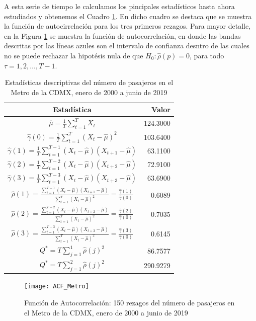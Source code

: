 \documentclass[
  a4paper,
]{article}
\begin{document}
A esta serie de tiempo le calculamos los pincipales estadísticos hasta
ahora estudiados y obtenemos el Cuadro \ref{Est_Pax}. En dicho cuadro se
destaca que se muestra la función de autocirrelación para los tres
primeros rezagos. Para mayor detalle, en la Figura \ref{Correlograma} se
muestra la función de autocorrelación, en donde las bandas descritas por
las líneas azules son el intervalo de confianza desntro de las cuales no
se puede rechazar la hipotésis nula de que \(H_0: \hat{\rho}(p) = 0\),
para todo \(\tau = 1, 2, \ldots, T-1\).

\begin{table}
\centering
\begin{tabular}{| c | r |}
\hline
Estadística & Valor \\
\hline
$\hat{\mu} = \frac{1}{T} \sum^T_{t=1} X_t$ & 124.3000 \\
$\hat{\gamma}(0) = \frac{1}{T} \sum^T_{t=1} (X_t - \hat{\mu})^2$ & 103.6400 \\
$\hat{\gamma}(1) = \frac{1}{T} \sum^{T - 1}_{t=1} (X_t - \hat{\mu})(X_{t+1} - \hat{\mu}) $ & 63.1100 \\
$\hat{\gamma}(2) = \frac{1}{T} \sum^{T - 2}_{t=1} (X_t - \hat{\mu})(X_{t+2} - \hat{\mu}) $ & 72.9100 \\
$\hat{\gamma}(3) = \frac{1}{T} \sum^{T - 3}_{t=1} (X_t - \hat{\mu})(X_{t+3} - \hat{\mu}) $ & 63.6900 \\
$\hat{\rho}(1) = \frac{\sum^{T - 1}_{t=1} (X_t - \hat{\mu})(X_{t+1} - \hat{\mu})}{\sum^T_{t=1} (X_t - \hat{\mu})^2} = \frac{\hat{\gamma}(1)}{\hat{\gamma}(0)}$ & 0.6089 \\
$\hat{\rho}(2) = \frac{\sum^{T - 2}_{t=1} (X_t - \hat{\mu})(X_{t+2} - \hat{\mu})}{\sum^T_{t=1} (X_t - \hat{\mu})^2} = \frac{\hat{\gamma}(2)}{\hat{\gamma}(0)}$ & 0.7035 \\
$\hat{\rho}(3) = \frac{\sum^{T - 3}_{t=1} (X_t - \hat{\mu})(X_{t+3} - \hat{\mu})}{\sum^T_{t=1} (X_t - \hat{\mu})^2} = \frac{\hat{\gamma}(3)}{\hat{\gamma}(0)}$ & 0.6145 \\
$Q^* = T \sum_{j = 1}^{1} \hat{\rho} (j)^2$ & 86.7577 \\
$Q^* = T \sum_{j = 1}^{2} \hat{\rho} (j)^2$ & 290.9279 \\
\hline
\end{tabular}
\caption{Estadísticas descriptivas del número de pasajeros en el Metro de la CDMX, enero de 2000 a junio de 2019}
\label{Est_Pax}
\end{table}

\begin{figure}
  \centering
    \texttt{[image: ACF\_Metro]}
  \caption{Función de Autocorrelación: 150 rezagos del número de pasajeros en el Metro de la CDMX, enero de 2000 a junio de 2019}
  \label{Correlograma}
\end{figure}


\printbibliography
\end{document}
